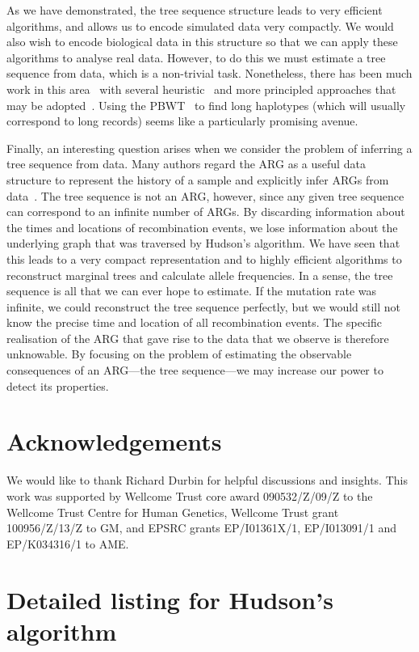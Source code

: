 \documentclass[10pt]{article}
\begin{document}
As we have demonstrated, the tree sequence structure leads to very efficient
algorithms, and allows us to encode simulated data very compactly. We would
also wish to encode biological data in this structure so that we can apply these
algorithms to analyse real data. However, to do this we must estimate a tree
sequence from data, which is a non-trivial task. Nonetheless, there has been
much work in this area~\citep{g14} with several heuristic~\citep{md06} and more
principled approaches that may be adopted~\citep{f13,rhgs14}. Using the
PBWT~\citep{d14} to find long haplotypes (which will usually correspond to long
records) seems like a particularly promising avenue.

Finally, an interesting question arises when we consider the problem of
inferring a tree sequence from data. Many authors regard the ARG as a useful
data structure to represent the history of a sample and explicitly infer ARGs
from data~\citep{md06,rhgs14}. The tree sequence is not an ARG, however, since
any given tree sequence can correspond to an infinite number of ARGs. By
discarding information about the times and locations of recombination events,
we lose information about the underlying graph that was traversed by Hudson's
algorithm. We have seen that this leads to a very compact representation and to
highly efficient algorithms to reconstruct marginal trees and calculate allele
frequencies. In a sense, the tree sequence is all that we can ever hope to
estimate. If the mutation rate was infinite, we could reconstruct the tree
sequence perfectly, but we would still not know the precise time and location
of all recombination events. The specific realisation of the ARG that gave rise
to the data that we observe is therefore unknowable. By focusing on the problem
of estimating the observable consequences of an ARG---the tree sequence---we
may increase our power to detect its properties.


\section*{Acknowledgements}
We would like to thank Richard Durbin for helpful discussions and insights.
This work was supported by Wellcome Trust core award 090532/Z/09/Z to the Wellcome
Trust Centre for Human Genetics, Wellcome Trust grant 100956/Z/13/Z to GM,
and EPSRC grants EP/I01361X/1, EP/I013091/1 and EP/K034316/1 to AME.




\appendix
\section{Detailed listing for Hudson's algorithm}
\label{app-algorithm-listing}
\end{document}
